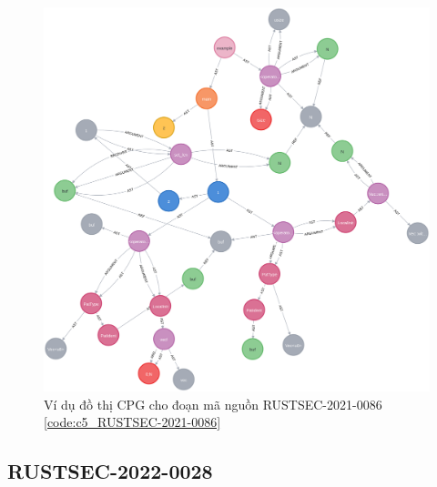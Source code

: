 \begin{figure}[H]
    \includegraphics[width=1\columnwidth]{figures/c5/c5_RUSTSEC-2021-0086}
    \centering
    \caption{Ví dụ đồ thị CPG cho đoạn mã nguồn RUSTSEC-2021-0086 \ref{code:c5_RUSTSEC-2021-0086}}
    \label{img:c5_RUSTSEC-2021-0086}
\end{figure}

\subsection{RUSTSEC-2022-0028}

